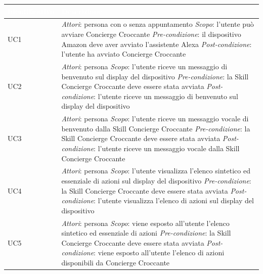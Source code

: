 \begin{center}
	\centering
	\renewcommand{\arraystretch}{1.5}
	\begin{longtable}{  p{2.5cm} p{9.8cm} }
		\rowcolor{tableHead}
		\textbf{\textcolor{white}{Identificativo}} & \textbf{\textcolor{white}{Descrizione}} \\
		\endhead  
		
		UC1 &  \textit{Attori}: persona con o senza appuntamento \newline \textit{Scopo}: l'utente può avviare Concierge Croccante \newline \textit{Pre-condizione}: il dispositivo Amazon deve aver avviato \mbox{l'assistente} Alexa \newline \textit{Post-condizione}: l'utente ha avviato Concierge Croccante \\
		
		UC2 &  \textit{Attori}: persona \newline \textit{Scopo}: l'utente riceve un messaggio di benvenuto sul display del dispositivo \newline \textit{Pre-condizione}: la Skill Concierge Croccante deve essere stata avviata \newline \textit{Post-condizione}: l'utente riceve un messaggio di benvenuto sul display del dispositivo \\
		
		UC3 &  \textit{Attori}: persona \newline \textit{Scopo}: l'utente riceve un messaggio vocale di benvenuto dalla Skill \mbox{Concierge} Croccante \newline \textit{Pre-condizione}: la Skill Concierge Croccante deve essere stata avviata \newline \textit{Post-condizione}: l'utente riceve un messaggio vocale dalla Skill Concierge Croccante\\
		
		UC4 &  \textit{Attori}: persona \newline \textit{Scopo}: l'utente visualizza l'elenco sintetico ed essenziale di azioni sul \mbox{display} del dispositivo \newline \textit{Pre-condizione}: la Skill Concierge Croccante deve essere stata avviata \newline \textit{Post-condizione}: l'utente visualizza l'elenco di azioni sul display del dispositivo \\
		
		UC5 &  \textit{Attori}: persona \newline \textit{Scopo}: viene esposto all'utente l'elenco sintetico ed essenziale di azioni \newline \textit{Pre-condizione}: la Skill Concierge Croccante deve essere stata avviata \newline \textit{Post-condizione}: viene esposto all'utente l'elenco di azioni disponibili da Concierge Croccante \\
		

\end{longtable}
\end{center}

